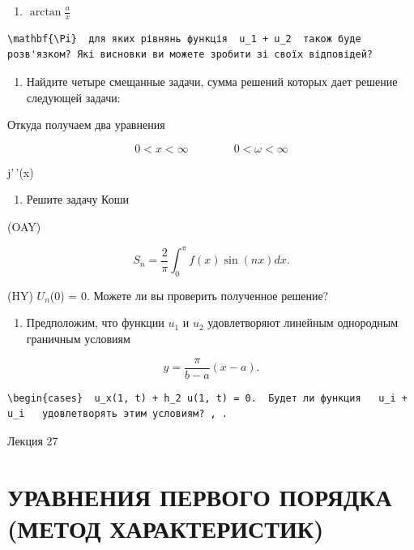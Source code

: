 \documentclass[
  ukrainian,
]{article}
\providecommand{\tightlist}{%
  \setlength{\itemsep}{0pt}\setlength{\parskip}{0pt}}
\begin{document}
\begin{enumerate}
\def\labelenumi{\arabic{enumi}.}
\setcounter{enumi}{8}
\tightlist
\item
  \(\arctan \frac{a}{x}\)
\end{enumerate}

\begin{verbatim}
\mathbf{\Pi}  для яких рівнянь функція  u_1 + u_2  також буде розв'язком? Які висновки ви можете зробити зі своїх відповідей?
\end{verbatim}

\begin{enumerate}
\def\labelenumi{\arabic{enumi}.}
\setcounter{enumi}{3}
\tightlist
\item
  Найдите четыре смещанные задачи, сумма решений которых дает решение
  следующей задачи:
\end{enumerate}

Откуда получаем два уравнения

\[
0 < x < \infty \qquad \qquad 0 < \omega < \infty
\]

j'\,'(x)

\begin{enumerate}
\def\labelenumi{\arabic{enumi}.}
\setcounter{enumi}{4}
\tightlist
\item
  Решите задачу Коши
\end{enumerate}

(OAY)

\[
S_n = \frac{2}{\pi} \int_0^{\pi} f(x) \sin(nx) dx.
\]

(HY) \(U_n\)(0) = 0. Можете ли вы проверить полученное решение?

\begin{enumerate}
\def\labelenumi{\arabic{enumi}.}
\setcounter{enumi}{5}
\tightlist
\item
  Предположим, что функции \(u_1\) и \(u_2\) удовлетворяют линейным
  однородным граничным условиям
\end{enumerate}

\[
y = \frac{\pi}{b - a} (x - a).
\]

\begin{verbatim}
\begin{cases}  u_x(1, t) + h_2 u(1, t) = 0.  Будет ли функция   u_i + u_i   удовлетворять этим условиям? , .
\end{verbatim}

Лекция 27

\section{УРАВНЕНИЯ ПЕРВОГО ПОРЯДКА (МЕТОД
ХАРАКТЕРИСТИК)}\label{ux443ux440ux430ux432ux43dux435ux43dux438ux44f-ux43fux435ux440ux432ux43eux433ux43e-ux43fux43eux440ux44fux434ux43aux430-ux43cux435ux442ux43eux434-ux445ux430ux440ux430ux43aux442ux435ux440ux438ux441ux442ux438ux43a}
\end{document}
